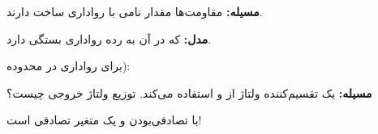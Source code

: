 

\textbf{مسیله:} مقاومت‌ها مقدار نامی  با رواداری ساخت دارند.

\textbf{مدل:}  که در آن  به رده رواداری بستگی دارد.

برای رواداری  در محدوده): 


\textbf{مسیله:} یک تقسیم‌کننده ولتاژ از  و  استفاده می‌کند. توزیع ولتاژ خروجی چیست؟


با تصادفی‌بودن  و  یک متغیر تصادفی است!


